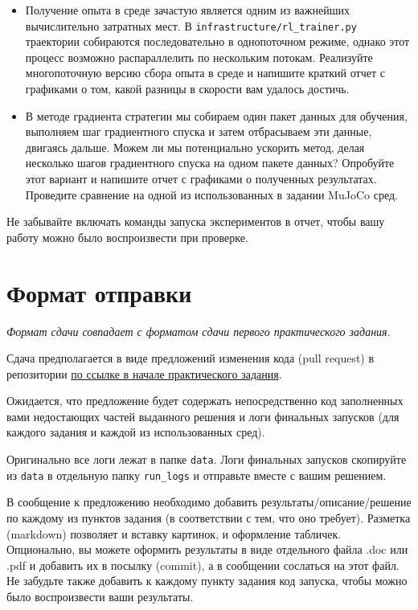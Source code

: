 \documentclass[12pt, oneside]{article}
\begin{document}
\begin{itemize}
    \item Получение опыта в среде зачастую является одним из важнейших вычислительно затратных мест. В \verb|infrastructure/rl_trainer.py| траектории собираются последовательно в однопоточном режиме, однако этот процесс возможно распараллелить по нескольким потокам. Реализуйте многопоточную версию сбора опыта в среде и напишите краткий отчет с графиками о том, какой разницы в скорости вам удалось достичь.
    \item В методе градиента стратегии мы собираем один пакет данных для обучения, выполняем шаг градиентного спуска и затем отбрасываем эти данные, двигаясь дальше. Можем ли мы потенциально ускорить метод, делая несколько шагов градиентного спуска на одном пакете данных? Опробуйте этот вариант и напишите отчет с графиками о полученных результатах. Проведите сравнение на одной из использованных в задании MuJoCo сред.
\end{itemize}

Не забывайте включать команды запуска экспериментов в отчет, чтобы вашу работу можно было воспроизвести при проверке.

\section{Формат отправки}

\textit{Формат сдачи совпадает с форматом сдачи первого практического задания.}

Сдача предполагается в виде предложений изменения кода (pull request) в репозитории \href{https://github.com/pkuderov/mipt-rl-hw-2022}{по ссылке в начале практического задания}.

Ожидается, что предложение будет содержать непосредственно код заполненных вами недостающих частей выданного решения и логи финальных запусков (для каждого задания и каждой из использованных сред). 

Оригинально все логи лежат в папке \verb|data|. Логи финальных запусков скопируйте из \verb|data| в отдельную папку \verb|run_logs| и отправьте вместе с вашим решением.

В сообщение к предложению необходимо добавить результаты/описание/решение по каждому из пунктов задания (в соответствии с тем, что оно требует). Разметка (markdown) позволяет и вставку картинок, и оформление табличек. Опционально, вы можете оформить результаты в виде отдельного файла .doc или .pdf и добавить их в посылку (commit), а в сообщении сослаться на этот файл. Не забудьте также добавить к каждому пункту задания код запуска, чтобы можно было воспроизвести ваши результаты.
\end{document}
